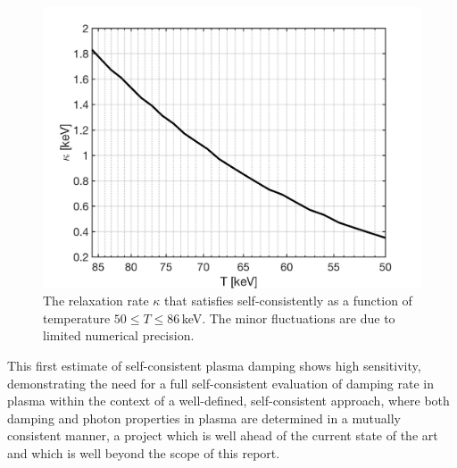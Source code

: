\begin{figure} 
\centerline{
\includegraphics[width=0.9\linewidth]{./plots/OverdampingKappa.jpg}}
\caption{The relaxation rate $\kappa$ that satisfies  self-consistently as a function of temperature $50\leqslant T\leqslant 86$\,keV. The minor fluctuations are due to limited numerical precision. }
\label{KappaSol:fig} 
\end{figure}

This first estimate of self-consistent plasma damping shows high sensitivity, demonstrating the need for a full self-consistent evaluation of damping rate in plasma within the context of a well-defined, self-consistent approach, where both damping and photon properties in plasma are determined in a mutually consistent manner, a project which is well ahead of the current state of the art and which is well beyond the scope of this report. 

